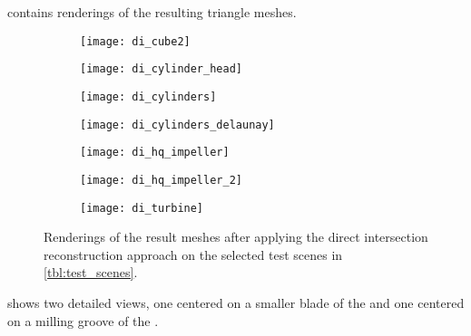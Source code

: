  contains renderings of the resulting triangle meshes.

\begin{figure}
	\centering
	\begin{subfigure}[b]{0.34\textwidth}
		\centering
		\texttt{[image: di\_cube2]}
		\caption{\cubes}
		\label{fig:di_cube2}
	\end{subfigure}
	\hspace{1cm}
	\begin{subfigure}[b]{0.34\textwidth}
		\centering
		\texttt{[image: di\_cylinder\_head]}
		\caption{\cylinderhead}
		\label{fig:di_cylinder_head}
	\end{subfigure}
	\begin{subfigure}[b]{0.34\textwidth}
		\centering
		\texttt{[image: di\_cylinders]}
		\caption{\cylinders}
		\label{fig:di_cylinders}
	\end{subfigure}
	\hspace{1cm}
	\begin{subfigure}[b]{0.34\textwidth}
		\centering
		\texttt{[image: di\_cylinders\_delaunay]}
		\caption{\cylindersd}
		\label{fig:di_cylinders_d}
	\end{subfigure}
	\begin{subfigure}[b]{0.34\textwidth}
		\centering
		\texttt{[image: di\_hq\_impeller]}
		\caption{\impeller}
		\label{fig:di_impeller}
	\end{subfigure}
	\hspace{1cm}
	\begin{subfigure}[b]{0.34\textwidth}
		\centering
		\texttt{[image: di\_hq\_impeller\_2]}
		\caption{\impellerhalf}
		\label{fig:di_impeller_2}
	\end{subfigure}
	\begin{subfigure}[b]{0.33\textwidth}
		\centering
		\texttt{[image: di\_turbine]}
		\caption{\turbine}
		\label{fig:di_turbine}
	\end{subfigure}
	\caption[Direct intersection result renderings]{
		Renderings of the result meshes after applying the direct intersection reconstruction approach on the selected test scenes in \cref{tbl:test_scenes}.
	}
	\label{fig:di_results}
\end{figure}

 shows two detailed views, one centered on a smaller blade of the \impeller and one centered on a milling groove of the \turbine.

